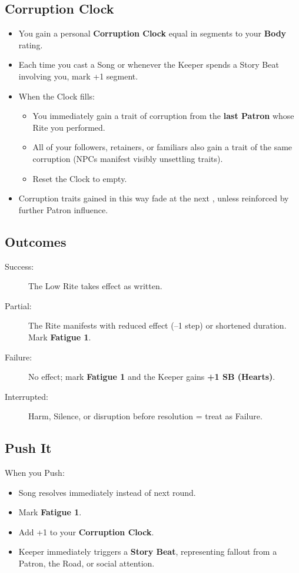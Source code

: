 \subsection*{Corruption Clock}
\begin{itemize}
  \item You gain a personal \textbf{Corruption Clock} equal in segments to your \textbf{Body} rating.
  \item Each time you cast a Song or whenever the Keeper spends a Story Beat involving you, mark +1 segment.
  \item When the Clock fills:
    \begin{itemize}
      \item You immediately gain a trait of corruption from the \textbf{last Patron} whose Rite you performed.
      \item All of your followers, retainers, or familiars also gain a trait of the same corruption (NPCs manifest visibly unsettling traits).
      \item Reset the Clock to empty.
    \end{itemize}
  \item Corruption traits gained in this way fade at the next , unless reinforced by further Patron influence.
\end{itemize}

\subsection*{Outcomes}
\begin{description}
\item[Success:] The Low Rite takes effect as written.
\item[Partial:] The Rite manifests with reduced effect (–1 step) or shortened duration. Mark \textbf{Fatigue 1}.
\item[Failure:] No effect; mark \textbf{Fatigue 1} and the Keeper gains \textbf{+1 SB (Hearts)}.
\item[Interrupted:] Harm, Silence, or disruption before resolution = treat as Failure.
\end{description}

\subsection*{Push It}
When you Push:
\begin{itemize}
  \item Song resolves immediately instead of next round.
  \item Mark \textbf{Fatigue 1}.
  \item Add +1 to your \textbf{Corruption Clock}.
  \item Keeper immediately triggers a \textbf{Story Beat}, representing fallout from a Patron, the Road, or social attention.
\end{itemize}

